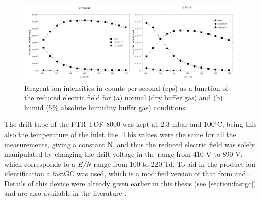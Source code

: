 \begin{figure}[t]
\centering
\includegraphics[width=1\textwidth]{pics/ketones/plot_1.png}
\caption{Reagent ion intensities in counts per second (cps) as a function of the reduced electric field for (a) normal (dry buffer gas) and (b) humid (5\% absolute
humidity buffer gas) conditions.}
\label{fig:ke_fig1}
\end{figure}



The drift tube of the PTR-TOF 8000 was kept at 2.3 mbar and 100$^{\circ}$C, being this also the temperature of the inlet line. This values were  the same for all the measurements, giving a constant N, and thus the reduced electric field was solely manipulated by changing the drift voltage in the range from 410 V to 890 V, which corresponds to a \textit{E/N} range from 100 to 220 Td.
To aid in the product ion identification a fastGC was used, which is a modified version of that from \citeauthor{romano2014wine} and \citeauthor{ruzsanyi2013multi} \cite{romano2014wine,ruzsanyi2013multi}.
Details of this device were already given earlier in this thesis (see \autoref{section:fastgc}) and are also available in the literature \cite{malaskova2019compendium}. 

